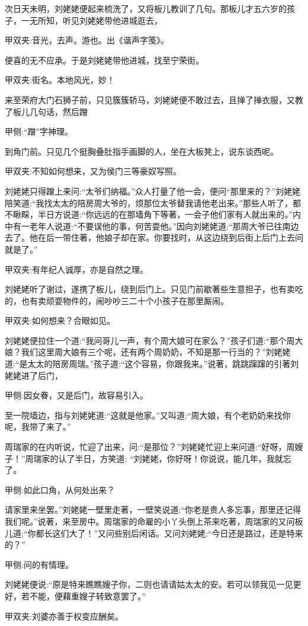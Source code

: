 \begin{parag}
    次日天未明，刘姥姥便起来梳洗了，又将板儿教训了几句。那板儿才五六岁的孩子，一无所知，听见刘姥姥带他进城逛去，\begin{note}甲双夹:音光，去声。游也。出《谐声字笺》。\end{note}便喜的无不应承。于是刘姥姥带他进城，找至宁荣街。\begin{note}甲双夹:街名。本地风光，妙！\end{note}来至荣府大门石狮子前，只见簇簇轿马，刘姥姥便不敢过去，且掸了掸衣服，又教了板儿几句话，然后蹭\begin{note}甲侧:“蹭”字神理。\end{note}到角门前。只见几个挺胸叠肚指手画脚的人，坐在大板凳上，说东谈西呢。\begin{note}甲双夹:不知如何想来，又为侯门三等豪奴写照。\end{note}刘姥姥只得蹭上来问:“太爷们纳福。”众人打量了他一会，便问“那里来的？”刘姥姥陪笑道:“我找太太的陪房周大爷的，烦那位太爷替我请他老出来。”那些人听了，都不瞅睬，半日方说道:“你远远的在那墙角下等著，一会子他们家有人就出来的。”内中有一老年人说道:“不要误他的事，何苦耍他。”因向刘姥姥道:“那周大爷已往南边去了。他在后一带住著，他娘子却在家。你要找时，从这边绕到后街上后门上去问就是了。”\begin{note}甲双夹:有年纪人诚厚，亦是自然之理。\end{note}
\end{parag}


\begin{parag}
    刘姥姥听了谢过，遂携了板儿，绕到后门上。只见门前歇著些生意担子，也有卖吃的，也有卖顽耍物件的，闹吵吵三二十个小孩子在那里厮闹。\begin{note}甲双夹:如何想来？合眼如见。\end{note}刘姥姥便拉住一个道:“我问哥儿一声，有个周大娘可在家么？”孩子们道:“那个周大娘？我们这里周大娘有三个呢，还有两个周奶奶，不知是那一行当的？”刘姥姥道:“是太太的陪房周瑞。”孩子道:“这个容易，你跟我来。”说著，跳跳蹿蹿的引著刘姥姥进了后门，\begin{note}甲侧:因女眷，又是后门，故容易引入。\end{note}至一院墙边，指与刘姥姥道:“这就是他家。”又叫道:“周大娘，有个老奶奶来找你呢，我带了来了。”
\end{parag}


\begin{parag}
    周瑞家的在内听说，忙迎了出来，问:“是那位？”刘姥姥忙迎上来问道:“好呀，周嫂子！”周瑞家的认了半日，方笑道: “刘姥姥，你好呀！你说说，能几年，我就忘了。\begin{note}甲侧:如此口角，从何处出来？\end{note}请家里来坐罢。”刘姥姥一壁里走著，一壁笑说道:“你老是贵人多忘事，那里还记得我们呢。”说著，来至房中。周瑞家的命雇的小丫头倒上茶来吃著，周瑞家的又问板儿道:“你都长这们大了！”又问些别后闲话。又问刘姥姥:“今日还是路过，还是特来的？”\begin{note}甲侧:问的有情理。\end{note}刘姥姥便说:“原是特来瞧瞧嫂子你，二则也请请姑太太的安。若可以领我见一见更好，若不能，便藉重嫂子转致意罢了。”\begin{note}甲双夹:刘婆亦善于权变应酬矣。\end{note}
\end{parag}


